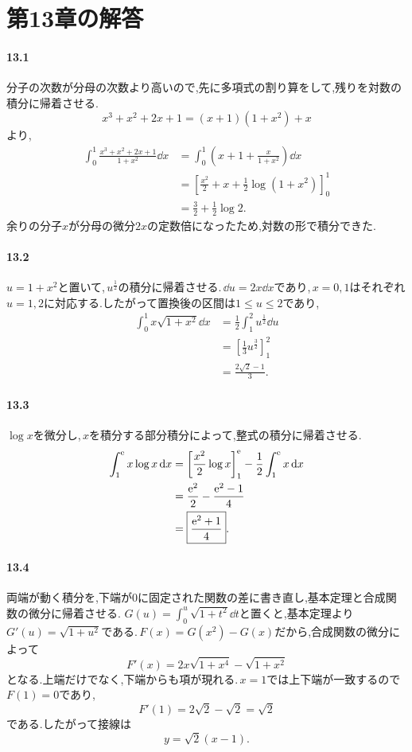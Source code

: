 \section{第13章の解答}\label{解答:第13章}

\paragraph{13.1}
分子の次数が分母の次数より高いので,先に多項式の割り算をして,残りを対数の積分に帰着させる.
\[
 x^3+x^2+2x+1=(x+1)(1+x^2)+x
\]
より,
\[
 \begin{aligned}
 \int_0^1\frac{x^3+x^2+2x+1}{1+x^2}\dd x
 &=\int_0^1\left(x+1+\frac{x}{1+x^2}\right)\dd x\\
 &=\left[\frac{x^2}{2}+x+\frac12\log(1+x^2)\right]_0^1\\
 &=\boxed{\frac32+\frac12\log2}.
 \end{aligned}
\]
余りの分子$x$が分母の微分$2x$の定数倍になったため,対数の形で積分できた.

\paragraph{13.2}
$u=1+x^2$と置いて,\,$u^{\frac12}$の積分に帰着させる.\,$\dd u=2x\dd x$であり,\,$x=0,1$はそれぞれ$u=1,2$に対応する.したがって置換後の区間は$1\le u\le2$であり,
\[
 \begin{aligned}
 \int_0^1x\sqrt{1+x^2}\dd x
 &=\frac12\int_1^2u^{\frac12}\dd u\\
 &=\left[\frac13u^{\frac32}\right]_1^2\\
 &=\boxed{\frac{2\sqrt2-1}{3}}.
 \end{aligned}
\]

\paragraph{13.3}
$\log x$を微分し,\,$x$を積分する部分積分によって,整式の積分に帰着させる.
\[
 \begin{aligned}
 \int_1^{\mathrm{e}}x\log x\,\mathrm{d} x
 &=\left[\frac{x^2}{2}\log x\right]_1^{\mathrm{e}}
   -\frac12\int_1^{\mathrm{e}}x\,\mathrm{d} x\\
 &=\frac{\mathrm{e}^2}{2}-\frac{\mathrm{e}^2-1}{4}\\
 &=\boxed{\frac{\mathrm{e}^2+1}{4}}.
 \end{aligned}
\]

\paragraph{13.4}
両端が動く積分を,下端が$0$に固定された関数の差に書き直し,基本定理と合成関数の微分に帰着させる.
$G(u)=\int_0^u\sqrt{1+t^2}\dd t$と置くと,基本定理より$G'(u)=\sqrt{1+u^2}$である.\,$F(x)=G(x^2)-G(x)$だから,合成関数の微分によって
\[
 F'(x)=2x\sqrt{1+x^4}-\sqrt{1+x^2}
\]
となる.上端だけでなく,下端からも項が現れる.\,$x=1$では上下端が一致するので$F(1)=0$であり,
\[
 F'(1)=2\sqrt2-\sqrt2=\sqrt2
\]
である.したがって接線は
\[
 \boxed{y=\sqrt2(x-1)}.
\]

